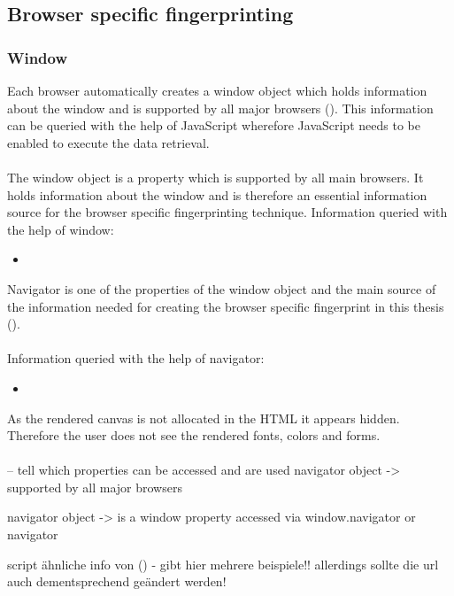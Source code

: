 \subsection{Browser specific fingerprinting}

\subsubsection{Window}
Each browser automatically creates a window object which holds information about the window and is supported by all major browsers (\textcite{javatptWindow}). This information can be queried with the help of JavaScript wherefore JavaScript needs to be enabled to execute the data retrieval.\\\\
The window object is a property which is supported by all main browsers. It holds information about the window and is therefore an essential information source for the browser specific fingerprinting technique.
Information queried with the help of window:
\begin{itemize}
	\item 
\end{itemize}

Navigator is one of the properties of the window object and the main source of the information needed for creating the browser specific fingerprint in this thesis (\textcite{javatptNav}).\\\\
Information queried with the help of navigator:
\begin{itemize}
	\item 
\end{itemize}


As the rendered canvas is not allocated in the HTML it appears hidden. Therefore the user does not see the rendered fonts, colors and forms.\\\\





-- tell which properties can be accessed and are used
navigator object -> supported by all major browsers

navigator object -> is a window property
accessed via window.navigator or navigator



script ähnliche info von (\textcite{jkula17}) - gibt hier mehrere beispiele!!
allerdings sollte die url auch dementsprechend geändert werden!

